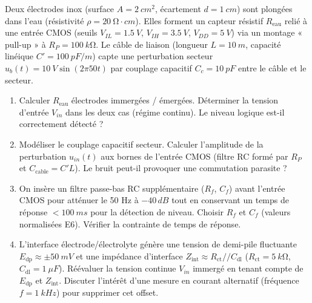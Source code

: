 \documentclass[11pt]{article}
\begin{document}
\begin{exercice}
Deux électrodes inox (surface $A = \SI{2}{cm^2}$, écartement $d = \SI{1}{cm}$) sont plongées dans l'eau (résistivité $\rho = \SI{20}{\ohm \cdot cm}$). Elles forment un capteur résistif $R_{\text{eau}}$ relié à une entrée CMOS (seuils $V_{IL} = \SI{1,5}{V}$, $V_{IH} = \SI{3,5}{V}$, $V_{DD} = \SI{5}{V}$) via un montage « pull-up » à $R_P = \SI{100}{k\ohm}$. Le câble de liaison (longueur $L = \SI{10}{m}$, capacité linéique $C' = \SI{100}{pF/m}$) capte une perturbation secteur $u_b(t) = \SI{10}{V} \sin(2\pi 50 t)$ par couplage capacitif $C_c = \SI{10}{pF}$ entre le câble et le secteur.
\begin{enumerate}
    \item Calculer $R_{\text{eau}}$ électrodes immergées / émergées. Déterminer la tension d'entrée $V_{in}$ dans les deux cas (régime continu). Le niveau logique est-il correctement détecté ?
    \item Modéliser le couplage capacitif secteur. Calculer l'amplitude de la perturbation $u_{in}(t)$ aux bornes de l'entrée CMOS (filtre RC formé par $R_P$ et $C_{\text{cable}} = C'L$). Le bruit peut-il provoquer une commutation parasite ?
    \item On insère un filtre passe-bas RC supplémentaire ($R_f$, $C_f$) avant l'entrée CMOS pour atténuer le 50 Hz à $-40\,\si{dB}$ tout en conservant un temps de réponse $< \SI{100}{ms}$ pour la détection de niveau. Choisir $R_f$ et $C_f$ (valeurs normalisées E6). Vérifier la contrainte de temps de réponse.
    \item L'interface électrode/électrolyte génère une tension de demi-pile fluctuante $E_{\text{dp}} \approx \pm \SI{50}{mV}$ et une impédance d'interface $Z_{\text{int}} \approx R_{\text{ct}} // C_{\text{dl}}$ ($R_{\text{ct}} = \SI{5}{k\ohm}$, $C_{\text{dl}} = \SI{1}{\mu F}$). Réévaluer la tension continue $V_{in}$ immergé en tenant compte de $E_{\text{dp}}$ et $Z_{\text{int}}$. Discuter l'intérêt d'une mesure en courant alternatif (fréquence $f = \SI{1}{kHz}$) pour supprimer cet offset.
\end{enumerate}
\end{exercice}
\end{document}
